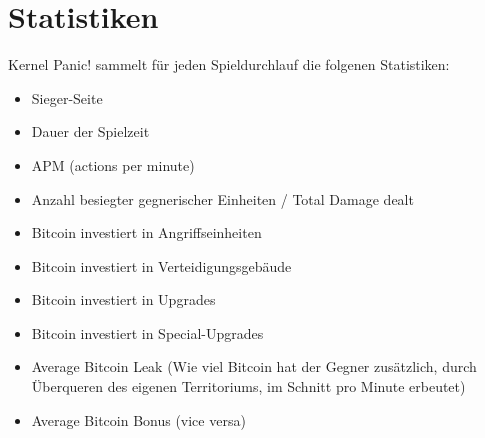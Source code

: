 \section{Statistiken}

%
%

Kernel Panic! sammelt für jeden Spieldurchlauf die folgenen Statistiken:
\begin{itemize}
	\item Sieger-Seite
	\item Dauer der Spielzeit
	\item APM (actions per minute)
	\item Anzahl besiegter gegnerischer Einheiten / Total Damage dealt
	\item Bitcoin investiert in Angriffseinheiten
	\item Bitcoin investiert in Verteidigungsgebäude
	\item Bitcoin investiert in Upgrades
	\item Bitcoin investiert in Special-Upgrades
	\item Average Bitcoin Leak (Wie viel Bitcoin hat der Gegner zusätzlich, durch Überqueren des eigenen Territoriums, im Schnitt pro Minute erbeutet)
	\item Average Bitcoin Bonus (vice versa)
\end{itemize}


